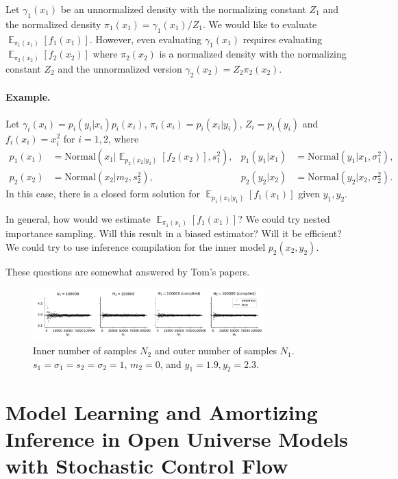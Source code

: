\documentclass[a4paper]{article}
\newcommand{\given}{\lvert}
\DeclareMathOperator{\E}{\mathbb{E}}
\begin{document}
Let $\gamma_1(x_1)$ be an unnormalized density with the normalizing constant $Z_1$ and the normalized density $\pi_1(x_1) = \gamma_1(x_1) / Z_1$. We would like to evaluate $\E_{\pi_1(x_1)}[f_1(x_1)]$.
However, even evaluating $\gamma_1(x_1)$ requires evaluating $\E_{\pi_2(x_2)}[f_2(x_2)]$ where $\pi_2(x_2)$ is a normalized density with the normalizing constant $Z_2$ and the unnormalized version $\gamma_2(x_2) = Z_2 \pi_2(x_2)$.

\paragraph{Example.}{Let $\gamma_i(x_i) = p_i(y_i \given x_i) p_i(x_i)$, $\pi_i(x_i) = p_i(x_i \given y_i)$, $Z_i = p_i(y_i)$ and $f_i(x_i) = x_i^2$ for $i = 1, 2$, where
\begin{align}
    p_1(x_1) &= \mathrm{Normal}(x_1 \given \E_{p_2(x_2 \given y_2)}[f_2(x_2)], s_1^2), &
    p_1(y_1 \given x_1) &= \mathrm{Normal}(y_1 \given x_1, \sigma_1^2), \\
    p_2(x_2) &= \mathrm{Normal}(x_2 \given m_2, s_2^2), &
    p_2(y_2 \given x_2) &= \mathrm{Normal}(y_2 \given x_2, \sigma_2^2).
\end{align}
In this case, there is a closed form solution for $\E_{p_1(x_1 \given y_1)}[f_1(x_1)]$ given $y_1, y_2$.}

In general, how would we estimate $\E_{\pi_1(x_1)}[f_1(x_1)]$?
We could try nested importance sampling.
Will this result in a biased estimator?
Will it be efficient?
We could try to use inference compilation for the inner model $p_2(x_2, y_2)$.

These questions are somewhat answered by Tom's papers.

\begin{figure}[htb]
    \centering
    \includegraphics[width=0.8\textwidth]{figures/unbiasedness_together.pdf}
    \caption{Inner number of samples $N_2$ and outer number of samples $N_1$. $s_1 = \sigma_1 = s_2 = \sigma_2 = 1$, $m_2 = 0$, and $y_1 = 1.9, y_2 = 2.3$.}
    \label{fig:unbiasedness_together}
\end{figure}

\section{Model Learning and Amortizing Inference in Open Universe Models with Stochastic Control Flow}
\end{document}
